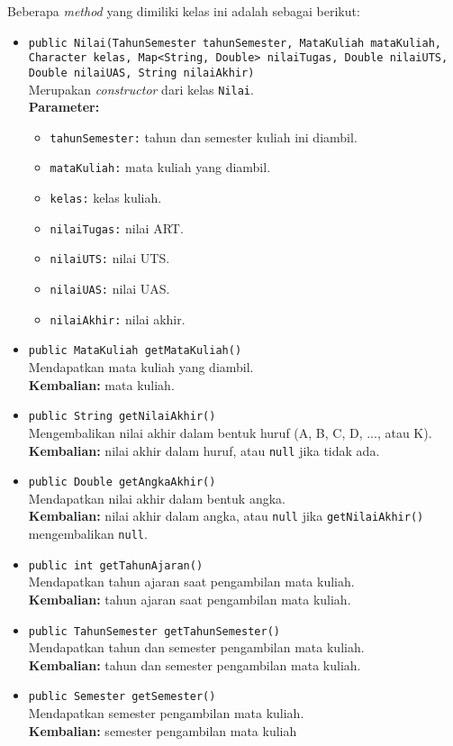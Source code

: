 Beberapa \textit{method} yang dimiliki kelas ini adalah sebagai berikut:
\begin{itemize}
	\item \texttt{public Nilai(TahunSemester tahunSemester, MataKuliah mataKuliah, Character kelas, Map<String, Double> nilaiTugas, Double nilaiUTS, Double nilaiUAS, String nilaiAkhir)}\\
	Merupakan \textit{constructor} dari kelas \texttt{Nilai}.\\
	\textbf{Parameter:}
	\begin{itemize}
		\item \texttt{tahunSemester:} tahun dan semester kuliah ini diambil.
		\item \texttt{mataKuliah:} mata kuliah yang diambil.
		\item \texttt{kelas:} kelas kuliah.
		\item \texttt{nilaiTugas:} nilai ART.
		\item \texttt{nilaiUTS:} nilai UTS.
		\item \texttt{nilaiUAS:} nilai UAS.
		\item \texttt{nilaiAkhir:} nilai akhir.
	\end{itemize}
		
	\item \texttt{public MataKuliah getMataKuliah()}\\
	Mendapatkan mata kuliah yang diambil.\\
	\textbf{Kembalian:} mata kuliah.
	
	\item \texttt{public String getNilaiAkhir()}\\
	Mengembalikan nilai akhir dalam bentuk huruf (A, B, C, D, ..., atau K).\\
	\textbf{Kembalian:} nilai akhir dalam huruf, atau \texttt{null} jika tidak ada.
	
	\item \texttt{public Double getAngkaAkhir()}\\
	Mendapatkan nilai akhir dalam bentuk angka.\\
	\textbf{Kembalian:}  nilai akhir dalam angka, atau \texttt{null} jika \texttt{getNilaiAkhir()} mengembalikan \texttt{null}.
	
	\item \texttt{public int getTahunAjaran()}\\
	Mendapatkan tahun ajaran saat pengambilan mata kuliah.\\
	\textbf{Kembalian:} tahun ajaran saat pengambilan mata kuliah.

    \item \texttt{public TahunSemester getTahunSemester()}\\
	Mendapatkan tahun dan semester pengambilan mata kuliah.\\
	\textbf{Kembalian:} tahun dan semester pengambilan mata kuliah.	
	
	\item \texttt{public Semester getSemester()}\\
	Mendapatkan semester pengambilan mata kuliah.\\
	\textbf{Kembalian:} semester pengambilan mata kuliah
	
\end{itemize}

